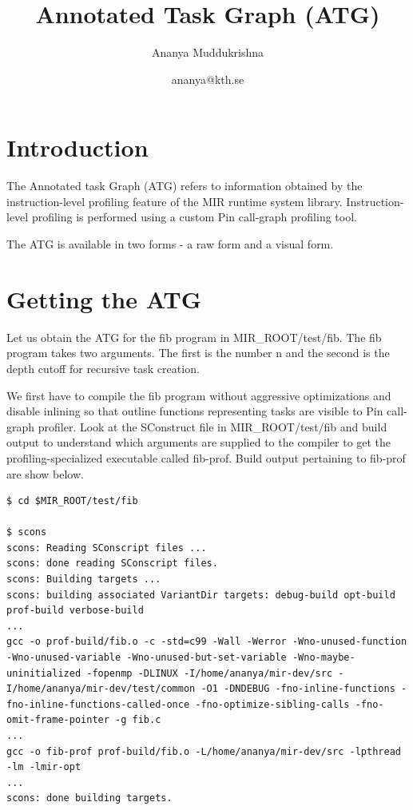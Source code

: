 \documentclass[11pt,a4paper,notitlepage]{article}
\author{Ananya Muddukrishna}
\date{ananya@kth.se}
\title{Annotated Task Graph (ATG)}
\begin{document}
\maketitle


\section{Introduction}
The Annotated task Graph (ATG) refers to information obtained by the instruction-level profiling feature of the MIR runtime system library.
Instruction-level profiling is performed using a custom Pin call-graph profiling tool.

The ATG is available in two forms - a raw form and a visual form.

\section{Getting the ATG}
\label{sec:getting-atg}
Let us obtain the ATG for the fib program in MIR\_ROOT/test/fib.
The fib program takes two arguments. The first is the number n and the second is the depth cutoff for recursive task creation.

We first have to compile the fib program without aggressive optimizations and disable inlining so that outline functions representing tasks are visible to Pin call-graph profiler. 
Look at the SConstruct file in MIR\_ROOT/test/fib and build output to understand which arguments are supplied to the compiler to get the profiling-specialized executable called fib-prof. 
Build output pertaining to fib-prof are show below.

\begin{lstlisting}[style=BashInputStyle]
$ cd $MIR_ROOT/test/fib

$ scons 
scons: Reading SConscript files ...
scons: done reading SConscript files.
scons: Building targets ...
scons: building associated VariantDir targets: debug-build opt-build prof-build verbose-build
...
gcc -o prof-build/fib.o -c -std=c99 -Wall -Werror -Wno-unused-function -Wno-unused-variable -Wno-unused-but-set-variable -Wno-maybe-uninitialized -fopenmp -DLINUX -I/home/ananya/mir-dev/src -I/home/ananya/mir-dev/test/common -O1 -DNDEBUG -fno-inline-functions -fno-inline-functions-called-once -fno-optimize-sibling-calls -fno-omit-frame-pointer -g fib.c
...
gcc -o fib-prof prof-build/fib.o -L/home/ananya/mir-dev/src -lpthread -lm -lmir-opt
...
scons: done building targets.
\end{lstlisting}
\end{document}
